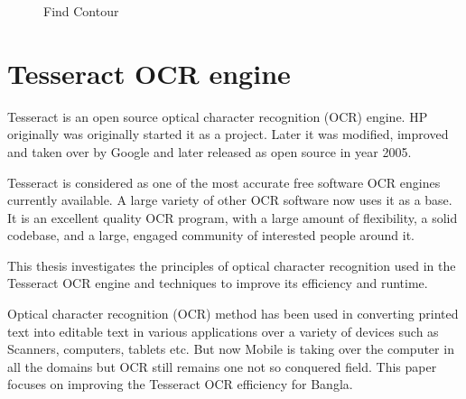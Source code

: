 \begin{figure}[H]
\centering
{}
\caption {Find Contour}
\label {fig:ContourDetection}
\end{figure}

\section{Tesseract OCR engine}
Tesseract is an open source optical character recognition (OCR) engine. HP originally was originally started it as a project. Later it was modified, improved and taken over by Google and later released as open source in year 2005. \cite{TesseractORCEngine} \cite{TesseractORCEngineOfficialWeb}

Tesseract is considered as one of the most accurate free software OCR engines currently available. A large variety of other OCR software now uses it as a base. It is an excellent quality OCR program, with a large amount of flexibility, a solid codebase, and a large, engaged community of interested people around it.

This thesis investigates the principles of optical character recognition used in the Tesseract OCR engine and techniques to improve its efficiency and runtime. 

Optical character recognition (OCR) method has been used in converting printed text into editable text in various applications over a variety of devices such as Scanners, computers, tablets etc. But now Mobile is taking over the computer in all the domains but OCR still remains one not so conquered field. This paper focuses on improving the Tesseract OCR efficiency for Bangla. 

